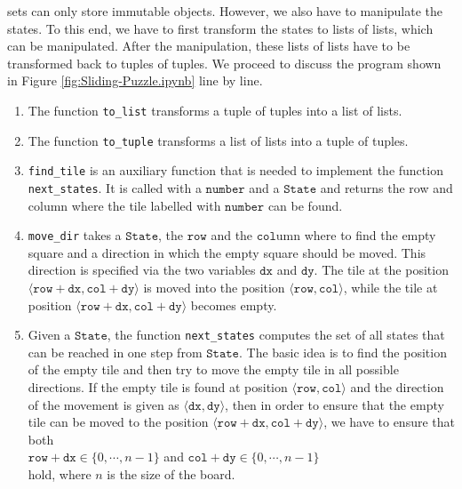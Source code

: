 sets can only store immutable objects.  However, we also have to manipulate the states.  To this end, we have
to first transform the states to lists of lists, which can be manipulated.  After the manipulation, these lists of
lists have to be transformed back to tuples of tuples.
We proceed to discuss the program shown in Figure \ref{fig:Sliding-Puzzle.ipynb} line by line.
\begin{enumerate}
\item The function \texttt{to\_list} transforms a tuple of tuples into a list of lists.
\item The function \texttt{to\_tuple} transforms a list of lists into a tuple of tuples.
\item \texttt{find\_tile} is an auxiliary function that is needed to implement the function \texttt{next\_states}.
      It is called with a $\texttt{number}$ and a $\texttt{State}$ and
      returns the row and column where the tile labelled with $\texttt{number}$ can be found.
\item \texttt{move\_dir} takes a $\texttt{State}$, the $\texttt{row}$ and the $\texttt{col}$umn
      where to find the empty square and a direction in which the empty square should be moved.
      This direction is specified via the two variables $\texttt{dx}$ and $\texttt{dy}$.  The tile
      at the position $\langle\mathtt{row} + \mathtt{dx}, \mathtt{col} + \mathtt{dy}\rangle$ is
      moved into the position $\langle\mathtt{row}, \mathtt{col}\rangle$, while the tile at position
      $\langle\mathtt{row} + \mathtt{dx}, \mathtt{col} + \mathtt{dy}\rangle$ becomes empty.
\item Given a $\texttt{State}$, the function \texttt{next\_states} computes the set of all states
      that can be reached in one step from $\texttt{State}$.  The basic idea is to find the position of the
      empty tile and then try to move the empty tile in all possible directions.  If the empty tile is found at
      position $\langle\mathtt{row}, \mathtt{col}\rangle$ and the direction of the movement is given as $\langle\mathtt{dx}, \mathtt{dy}\rangle$, then
      in order to ensure that the empty tile can be moved to the position $\langle\mathtt{row}+\mathtt{dx}, \mathtt{col}+\mathtt{dy}\rangle$,
      we have to ensure that both
      \\[0.2cm]
      \hspace*{1.3cm}
      $\mathtt{row}+\mathtt{dx} \in \{0,\cdots,n-1\}$ \quad and \quad
      $\mathtt{col}+\mathtt{dy} \in \{0,\cdots,n-1\}$
      \\[0.2cm]
      hold, where $n$ is the size of the board. \eox 
\end{enumerate}

